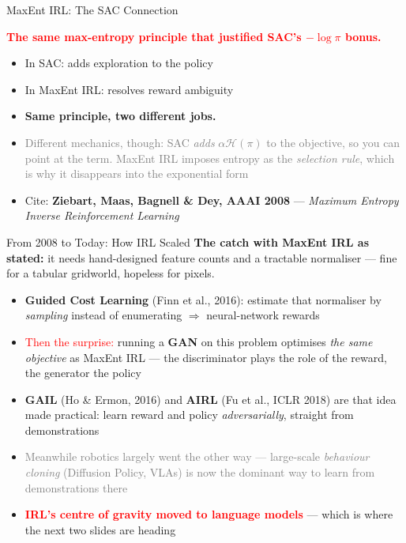\begin{frame}{MaxEnt IRL: The SAC Connection}
\vspace{0.4em}
\begin{center}
\textcolor{red}{\textbf{The same max-entropy principle that justified SAC's $-\log\pi$ bonus.}}
\end{center}
\vspace{0.8em}
\begin{itemize}
    \setlength{\itemsep}{0.7em}
    \item In SAC: adds exploration to the policy
    \item In MaxEnt IRL: resolves reward ambiguity
    \item \textbf{Same principle, two different jobs.}
    \item \textcolor{gray}{Different mechanics, though: SAC \emph{adds} $\alpha\mathcal{H}(\pi)$ to the objective, so you can point at the term. MaxEnt IRL imposes entropy as the \emph{selection rule}, which is why it disappears into the exponential form}
    \item Cite: \textbf{Ziebart, Maas, Bagnell \& Dey, AAAI 2008} --- \emph{Maximum Entropy Inverse Reinforcement Learning}
\end{itemize}
\end{frame}

\begin{frame}{From 2008 to Today: How IRL Scaled}
\textbf{The catch with MaxEnt IRL as stated:} it needs hand-designed feature counts and a tractable normaliser --- fine for a tabular gridworld, hopeless for pixels.
\vspace{0.3em}
\begin{itemize}
    \setlength{\itemsep}{0.4em}
    \item \textbf{Guided Cost Learning} (Finn et al., 2016): estimate that normaliser by \emph{sampling} instead of enumerating $\Rightarrow$ neural-network rewards
    \item \textcolor{red}{Then the surprise:} running a \textbf{GAN} on this problem optimises \emph{the same objective} as MaxEnt IRL --- the discriminator plays the role of the reward, the generator the policy
    \item \textbf{GAIL} (Ho \& Ermon, 2016) and \textbf{AIRL} (Fu et al., ICLR 2018) are that idea made practical: learn reward and policy \emph{adversarially}, straight from demonstrations
    \item \textcolor{gray}{Meanwhile robotics largely went the other way --- large-scale \emph{behaviour cloning} (Diffusion Policy, VLAs) is now the dominant way to learn from demonstrations there}
    \item \textcolor{red}{\textbf{IRL's centre of gravity moved to language models}} --- which is where the next two slides are heading
\end{itemize}
\end{frame}

